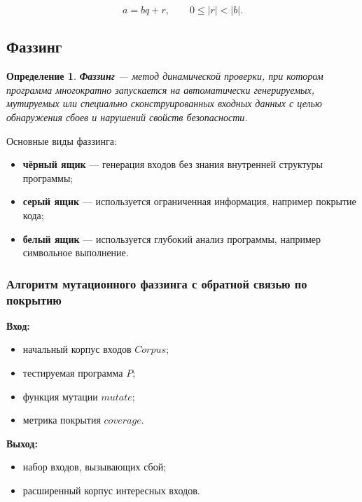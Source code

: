 \documentclass[12pt,a4paper]{article}
\newtheorem{definition}{Определение}
\begin{document}
\[
a = bq + r,\qquad 0 \le |r| < |b|.
\]

\subsection{Фаззинг}

\begin{definition}
\textbf{Фаззинг} --- метод динамической проверки, при котором программа многократно запускается на автоматически генерируемых, мутируемых или специально сконструированных входных данных с целью обнаружения сбоев и нарушений свойств безопасности.
\end{definition}

Основные виды фаззинга:

\begin{itemize}
  \item \textbf{чёрный ящик} --- генерация входов без знания внутренней структуры программы;
  \item \textbf{серый ящик} --- используется ограниченная информация, например покрытие кода;
  \item \textbf{белый ящик} --- используется глубокий анализ программы, например символьное выполнение.
\end{itemize}

\subsubsection{Алгоритм мутационного фаззинга с обратной связью по покрытию}

\textbf{Вход:}
\begin{itemize}
  \item начальный корпус входов $Corpus$;
  \item тестируемая программа $P$;
  \item функция мутации $mutate$;
  \item метрика покрытия $coverage$.
\end{itemize}

\textbf{Выход:}
\begin{itemize}
  \item набор входов, вызывающих сбой;
  \item расширенный корпус интересных входов.
\end{itemize}
\end{document}
